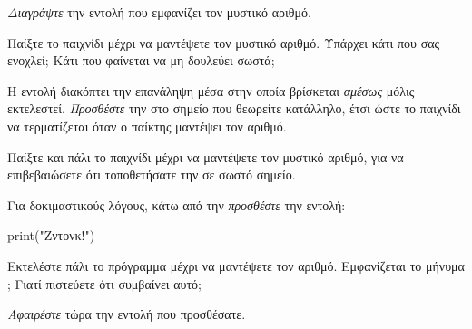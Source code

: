 \documentclass[a4paper,11pt,oneside]{book}
\begin{document}
\begin{step}

\emph{Διαγράψτε} την εντολή που εμφανίζει τον μυστικό αριθμό.

Παίξτε το παιχνίδι μέχρι να μαντέψετε τον μυστικό αριθμό. Υπάρχει κάτι που σας ενοχλεί; Κάτι που φαίνεται να μη δουλεύει σωστά;

\marginnote[14pt]{\icondiscuss}
\dottedline

\dottedline

\end{step}

\begin{step}
Η εντολή  διακόπτει την επανάληψη μέσα στην οποία βρίσκεται \emph{αμέσως} μόλις εκτελεστεί.
\emph{Προσθέστε} την  στο σημείο που θεωρείτε κατάλληλο, έτσι ώστε το παιχνίδι να τερματίζεται όταν ο παίκτης μαντέψει τον αριθμό.

Παίξτε και πάλι το παιχνίδι μέχρι να μαντέψετε τον μυστικό αριθμό, για να επιβεβαιώσετε ότι τοποθετήσατε την  σε σωστό σημείο.
\end{step}

\begin{step}
Για δοκιμαστικούς λόγους, κάτω από την  \emph{προσθέστε} την εντολή:

\begin{pynew}
print("Ζντονκ!")
\end{pynew}

Εκτελέστε πάλι το πρόγραμμα μέχρι να μαντέψετε τον αριθμό. Εμφανίζεται το μήνυμα ; Γιατί πιστεύετε ότι συμβαίνει αυτό;

\marginnote[14pt]{\icondiscuss}
\dottedline

\dottedline

\emph{Αφαιρέστε} τώρα την εντολή που προσθέσατε.
\end{step}
\end{document}
